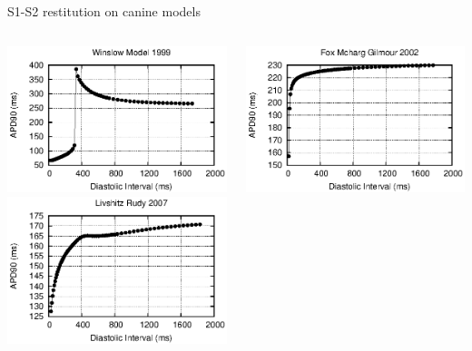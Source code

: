 \documentclass[t,xcolor={usenames,dvipsnames}]{beamer}
\begin{document}
\begin{frame}{S1-S2 restitution on canine models}
\begin{columns}[T]
\begin{column}{.33\linewidth}
\begin{center}
\includegraphics[width=\textwidth]{winslow_model_1999_s1s2_curve}\\
\vspace{.1cm}
\includegraphics[width=\textwidth]{livshitz_rudy_2007_s1s2_curve}
\end{center}
\end{column}
\begin{column}{.33\linewidth}
\begin{center}
\includegraphics[width=\textwidth]{fox_mcharg_gilmour_2002_s1s2_curve}\\

\end{center}
\end{column}
\end{columns}
\end{frame}
\end{document}
